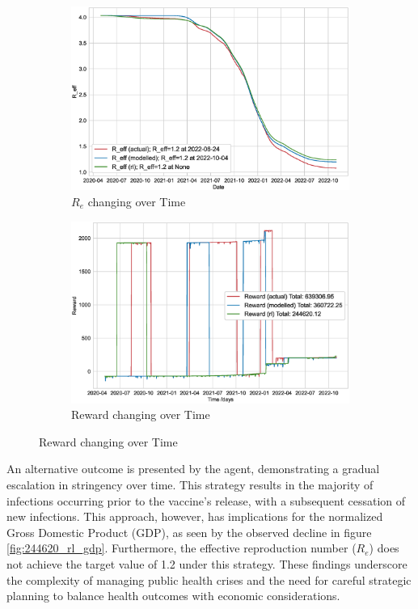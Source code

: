 \documentclass[tikz,fleqn,12pt]{wlscirep}
\begin{document}
\begin{figure}[htbp!]
  \begin{subfigure}[t]{0.48\textwidth}
    \centering
    \includegraphics[width=\linewidth]{images/244620/rl_r_eff.eps}
    \caption{$R_e$ changing over Time}
  \end{subfigure}
  \label{fig:244620_rl_r_eff}
  \hfill
  \begin{subfigure}[t]{0.48\textwidth}
    \centering
    \includegraphics[width=\linewidth]{images/244620/rl_reward.eps}
    \caption{Reward changing over Time}
  \end{subfigure}
  \label{fig:244620_rl_reward}
\end{figure}
An alternative outcome is presented by the agent, demonstrating a gradual escalation in stringency over time. This strategy results in the majority of infections occurring prior to the vaccine's release, with a subsequent cessation of new infections. This approach, however, has implications for the normalized Gross Domestic Product (GDP), as seen by the observed decline in figure \cref{fig:244620_rl_gdp}. Furthermore, the effective reproduction number ($R_e$) does not achieve the target value of 1.2 under this strategy. These findings underscore the complexity of managing public health crises and the need for careful strategic planning to balance health outcomes with economic considerations.
\end{document}
